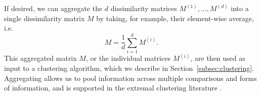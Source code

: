 \documentclass[12pt,compact]{article}
\newcommand{\JSGa}{\mathop{\mathrm{JS}^{\mathrm{G}_{\lambda}}}\nolimits}
\begin{document}
If desired, we can aggregate the $d$ dissimilarity matrices $M^{(1)}, \ldots, M^{(d)}$ into a single dissimilarity matrix $M$ by taking, for example, their element-wise average, i.e. 
\begin{equation} \label{eq:aggregate_matrix}
  M = \frac{1}{d} \sum_{i=1}^d M^{(i)}.
\end{equation}
This aggregated matrix $M$, or the individual matrices $M^{(i)}$, are then used as input to a clustering algorithm, which we describe in Section~\ref{subsec:clustering}.
Aggregating allows us to pool information across multiple comparisons and forms of information, and is supported in the extremal clustering literature \citep{Mornet2017-is}.

\end{document}
